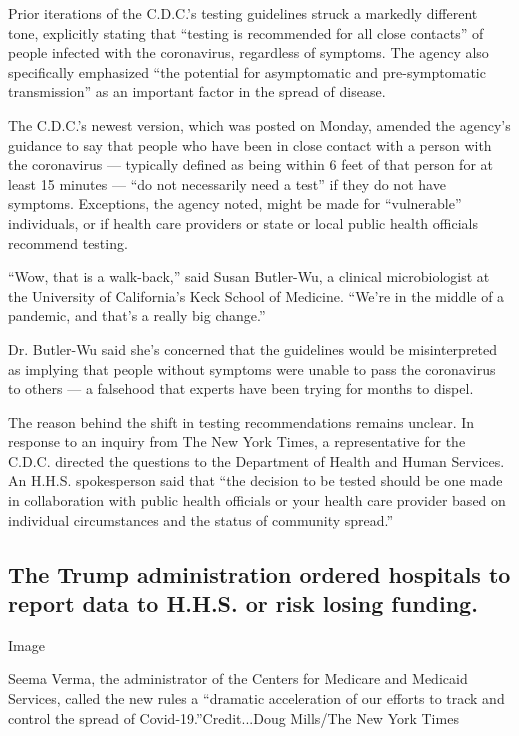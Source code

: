 Prior iterations of the C.D.C.'s testing guidelines struck a markedly
different tone, explicitly stating that ``testing is recommended for all
close contacts'' of people infected with the coronavirus, regardless of
symptoms. The agency also specifically emphasized ``the potential for
asymptomatic and pre-symptomatic transmission'' as an important factor
in the spread of disease.

The C.D.C.'s newest version, which was posted on Monday, amended the
agency's guidance to say that people who have been in close contact with
a person with the coronavirus --- typically defined as being within 6
feet of that person for at least 15 minutes --- ``do not necessarily
need a test'' if they do not have symptoms. Exceptions, the agency
noted, might be made for ``vulnerable'' individuals, or if health care
providers or state or local public health officials recommend testing.

``Wow, that is a walk-back,'' said Susan Butler-Wu, a clinical
microbiologist at the University of California's Keck School of
Medicine. ``We're in the middle of a pandemic, and that's a really big
change.''

Dr. Butler-Wu said she's concerned that the guidelines would be
misinterpreted as implying that people without symptoms were unable to
pass the coronavirus to others --- a falsehood that experts have been
trying for months to dispel.

The reason behind the shift in testing recommendations remains unclear.
In response to an inquiry from The New York Times, a representative for
the C.D.C. directed the questions to the Department of Health and Human
Services. An H.H.S. spokesperson said that ``the decision to be tested
should be one made in collaboration with public health officials or your
health care provider based on individual circumstances and the status of
community spread.''

\hypertarget{the-trump-administration-ordered-hospitals-to-report-data-to-hhs-or-risk-losing-funding}{%
\subsection{The Trump administration ordered hospitals to report data to
H.H.S. or risk losing
funding.}\label{the-trump-administration-ordered-hospitals-to-report-data-to-hhs-or-risk-losing-funding}}

Image

Seema Verma, the administrator of the Centers for Medicare and Medicaid
Services, called the new rules a ``dramatic acceleration of our efforts
to track and control the spread of Covid-19.''Credit...Doug Mills/The
New York Times

